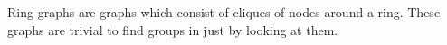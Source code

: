 Ring graphs are graphs which consist of cliques of nodes
around a ring. These graphs are trivial to find groups in
just by looking at them.
